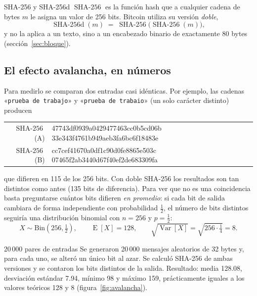 \documentclass[11pt,a4paper]{article}
\newcommand{\Esp}[1]{\operatorname{E}\!\left[#1\right]}
\newcommand{\Var}[1]{\operatorname{Var}\!\left[#1\right]}
\newcommand{\SHA}{\operatorname{SHA\text{-}256}}
\newcommand{\SHAd}{\operatorname{SHA\text{-}256d}}
\begin{document}
\begin{definicion}{SHA-256 y SHA-256d}\label{def:sha}
$\SHA$ es la función hash que a cualquier cadena de bytes $m$ le asigna un valor de 256 bits. Bitcoin utiliza su versión \emph{doble},
\[
  \SHAd(m)\;=\;\SHA\bigl(\SHA(m)\bigr),
\]
y no la aplica a un texto, sino a un encabezado binario de exactamente 80 bytes (sección~\ref{sec:bloque}).
\end{definicion}

\subsection{El efecto avalancha, en números}

Para medirlo se comparan dos entradas casi idénticas. Por ejemplo, las cadenas «\texttt{prueba de trabajo}» y «\texttt{prueba de trabaio}» (un solo carácter distinto) producen

\begin{center}
\small\ttfamily
\begin{tabular}{@{}rl@{}}
$\SHA$(A) & 47743df0939a0429477463cc0b5cd06b\,33e343f4761b949aeb3fa6bc6f18483e\\
$\SHA$(B) & cc7cef41670a0df1c90d0fe8865e503c\,07465f2ab3440d67f40ef2de683309fa\\
\end{tabular}
\end{center}

\noindent que difieren en 115 de los 256 bits. Con doble SHA-256 los resultados son tan distintos como antes (135 bits de diferencia). Para ver que no es una coincidencia basta preguntarse cuántos bits difieren \emph{en promedio}: si cada bit de salida cambiara de forma independiente con probabilidad $\tfrac12$, el número de bits distintos seguiría una distribución binomial con $n=256$ y $p=\tfrac12$:
\[
  X\sim\mathrm{Bin}\!\left(256,\tfrac12\right),\qquad
  \Esp{X}=128,\qquad \sqrt{\Var{X}}=\sqrt{256\cdot\tfrac14}=8 .
\]

\begin{verificacion}{20\,000 pares de entradas}\label{ver:avalancha}
Se generaron 20\,000 mensajes aleatorios de 32 bytes y, para cada uno, se alteró un único bit al azar. Se calculó SHA-256 de ambas versiones y se contaron los bits distintos de la salida. Resultado: media \num{128.08}, desviación estándar \num{7.94}, mínimo 98 y máximo 159, prácticamente iguales a los valores teóricos 128 y 8 (figura~\ref{fig:avalancha}).
\end{verificacion}
\end{document}
